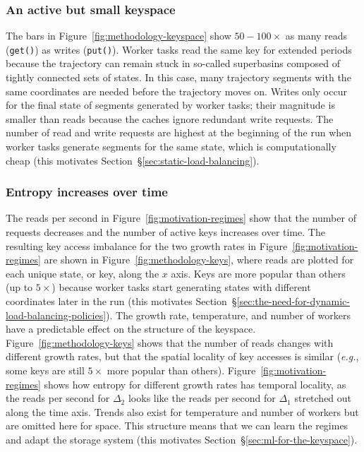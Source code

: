 \subsubsection*{An active but small keyspace} The bars in
Figure~\ref{fig:methodology-keyspace} show \(50-100\times\) as many reads
(\texttt{get()}) as writes (\texttt{put()}).  Worker tasks read the same key
for extended periods because the trajectory can remain stuck in so-called
superbasins composed of tightly connected sets of states. In this case, many
trajectory segments with the same coordinates are needed before the trajectory
moves on.  Writes only occur for the final state of segments generated by
worker tasks; their magnitude is smaller than reads because the caches ignore
redundant write requests. The number of read and write requests are highest at
the beginning of the run when worker tasks generate segments for the same
state, which is computationally cheap (this motivates
Section~\S\ref{sec:static-load-balancing}).

\subsubsection*{Entropy increases over time} The reads per second in
Figure~\ref{fig:motivation-regimes} show that the number of requests decreases
and the number of active keys increases over time. The resulting key access
imbalance for the two growth rates in Figure~\ref{fig:motivation-regimes} are
shown in Figure~\ref{fig:methodology-keys}, where reads are plotted for each
unique state, or key, along the \(x\) axis. Keys are more popular than others
(up to \(5\times\)) because worker tasks start generating states with different
coordinates later in the run (this motivates
Section~\S\ref{sec:the-need-for-dynamic-load-balancing-policies}).  The growth
rate, temperature, and number of workers have a predictable effect on the
structure of the keyspace.  Figure~\ref{fig:methodology-keys} shows that the
number of reads changes with different growth rates, but that the spatial
locality of key accesses is similar ({\it e.g.}, some keys are still
\(5\times\) more popular than others).  Figure~\ref{fig:motivation-regimes}
shows how entropy for different growth rates has temporal locality, as the
reads per second for \(\Delta_2\) looks like the reads per second for
\(\Delta_1\) stretched out along the time axis.  Trends also exist for
temperature and number of workers but are omitted here for space. This
structure means that we can learn the regimes and adapt the storage system
(this motivates Section~\S\ref{sec:ml-for-the-keyspace}).
